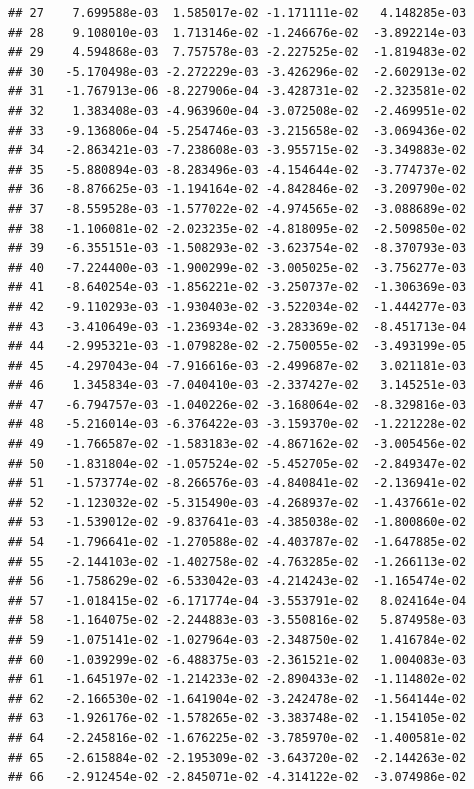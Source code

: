 \documentclass[
]{article}
\begin{document}
\begin{verbatim}
## 27    7.699588e-03  1.585017e-02 -1.171111e-02   4.148285e-03
## 28    9.108010e-03  1.713146e-02 -1.246676e-02  -3.892214e-03
## 29    4.594868e-03  7.757578e-03 -2.227525e-02  -1.819483e-02
## 30   -5.170498e-03 -2.272229e-03 -3.426296e-02  -2.602913e-02
## 31   -1.767913e-06 -8.227906e-04 -3.428731e-02  -2.323581e-02
## 32    1.383408e-03 -4.963960e-04 -3.072508e-02  -2.469951e-02
## 33   -9.136806e-04 -5.254746e-03 -3.215658e-02  -3.069436e-02
## 34   -2.863421e-03 -7.238608e-03 -3.955715e-02  -3.349883e-02
## 35   -5.880894e-03 -8.283496e-03 -4.154644e-02  -3.774737e-02
## 36   -8.876625e-03 -1.194164e-02 -4.842846e-02  -3.209790e-02
## 37   -8.559528e-03 -1.577022e-02 -4.974565e-02  -3.088689e-02
## 38   -1.106081e-02 -2.023235e-02 -4.818095e-02  -2.509850e-02
## 39   -6.355151e-03 -1.508293e-02 -3.623754e-02  -8.370793e-03
## 40   -7.224400e-03 -1.900299e-02 -3.005025e-02  -3.756277e-03
## 41   -8.640254e-03 -1.856221e-02 -3.250737e-02  -1.306369e-03
## 42   -9.110293e-03 -1.930403e-02 -3.522034e-02  -1.444277e-03
## 43   -3.410649e-03 -1.236934e-02 -3.283369e-02  -8.451713e-04
## 44   -2.995321e-03 -1.079828e-02 -2.750055e-02  -3.493199e-05
## 45   -4.297043e-04 -7.916616e-03 -2.499687e-02   3.021181e-03
## 46    1.345834e-03 -7.040410e-03 -2.337427e-02   3.145251e-03
## 47   -6.794757e-03 -1.040226e-02 -3.168064e-02  -8.329816e-03
## 48   -5.216014e-03 -6.376422e-03 -3.159370e-02  -1.221228e-02
## 49   -1.766587e-02 -1.583183e-02 -4.867162e-02  -3.005456e-02
## 50   -1.831804e-02 -1.057524e-02 -5.452705e-02  -2.849347e-02
## 51   -1.573774e-02 -8.266576e-03 -4.840841e-02  -2.136941e-02
## 52   -1.123032e-02 -5.315490e-03 -4.268937e-02  -1.437661e-02
## 53   -1.539012e-02 -9.837641e-03 -4.385038e-02  -1.800860e-02
## 54   -1.796641e-02 -1.270588e-02 -4.403787e-02  -1.647885e-02
## 55   -2.144103e-02 -1.402758e-02 -4.763285e-02  -1.266113e-02
## 56   -1.758629e-02 -6.533042e-03 -4.214243e-02  -1.165474e-02
## 57   -1.018415e-02 -6.171774e-04 -3.553791e-02   8.024164e-04
## 58   -1.164075e-02 -2.244883e-03 -3.550816e-02   5.874958e-03
## 59   -1.075141e-02 -1.027964e-03 -2.348750e-02   1.416784e-02
## 60   -1.039299e-02 -6.488375e-03 -2.361521e-02   1.004083e-03
## 61   -1.645197e-02 -1.214233e-02 -2.890433e-02  -1.114802e-02
## 62   -2.166530e-02 -1.641904e-02 -3.242478e-02  -1.564144e-02
## 63   -1.926176e-02 -1.578265e-02 -3.383748e-02  -1.154105e-02
## 64   -2.245816e-02 -1.676225e-02 -3.785970e-02  -1.400581e-02
## 65   -2.615884e-02 -2.195309e-02 -3.643720e-02  -2.144263e-02
## 66   -2.912454e-02 -2.845071e-02 -4.314122e-02  -3.074986e-02

\end{verbatim}
\end{document}
